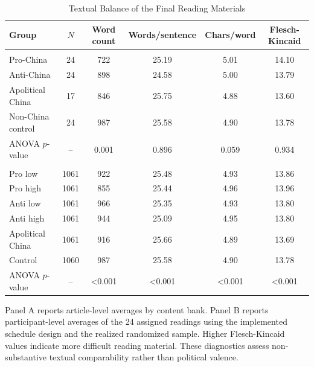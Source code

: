 \begin{table}[H]
\centering
\begin{threeparttable}
\caption{Textual Balance of the Final Reading Materials}
\label{tab:text_balance}
\footnotesize
\begin{tabular}{lccccc}
\toprule
Group & $N$ & Word count & Words/sentence & Chars/word & Flesch-Kincaid\\
\midrule
\addlinespace[0.3em]
\multicolumn{6}{l}{\textit{Panel A. Article pools}}\\
Pro-China & 24 & 722 & 25.19 & 5.01 & 14.10\\
Anti-China & 24 & 898 & 24.58 & 5.00 & 13.79\\
Apolitical China & 17 & 846 & 25.75 & 4.88 & 13.60\\
Non-China control & 24 & 987 & 25.58 & 4.90 & 13.78\\
ANOVA $p$-value & -- & 0.001 & 0.896 & 0.059 & 0.934\\
\addlinespace[0.45em]
\multicolumn{6}{l}{\textit{Panel B. Average assigned 24-reading bundle by arm}}\\
Pro low & 1061 & 922 & 25.48 & 4.93 & 13.86\\
Pro high & 1061 & 855 & 25.44 & 4.96 & 13.96\\
Anti low & 1061 & 966 & 25.35 & 4.93 & 13.80\\
Anti high & 1061 & 944 & 25.09 & 4.95 & 13.80\\
Apolitical China & 1061 & 916 & 25.66 & 4.89 & 13.69\\
Control & 1060 & 987 & 25.58 & 4.90 & 13.78\\
ANOVA $p$-value & -- & <0.001 & <0.001 & <0.001 & <0.001\\
\bottomrule
\end{tabular}
\begin{tablenotes}
\footnotesize
\item Panel A reports article-level averages by content bank. Panel B reports participant-level averages of the 24 assigned readings using the implemented schedule design and the realized randomized sample. Higher Flesch-Kincaid values indicate more difficult reading material. These diagnostics assess non-substantive textual comparability rather than political valence.
\end{tablenotes}
\end{threeparttable}
\end{table}
